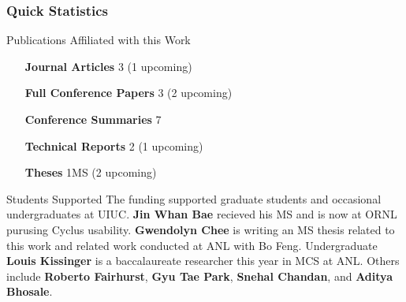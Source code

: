 \begin{frame}
        \frametitle{Quick Statistics}
        \begin{block}{Publications Affiliated with this Work}
                \begin{itemize}
                  \setlength{\itemindent}{3cm}
                        \item[\textbf{Journal Articles}] 3 (1 upcoming)
                        \item[\textbf{Full Conference Papers}] 3 (2 upcoming) 
                        \item[\textbf{Conference Summaries}] 7
                        \item[\textbf{Technical Reports}] 2 (1 upcoming)
                        \item[\textbf{Theses}] 1MS (2 upcoming)
                \end{itemize}
        \end{block}

                \begin{block}{Students Supported}
                        The funding supported graduate students and 
                        occasional undergraduates at UIUC.
                        \textbf{Jin Whan Bae} recieved his MS and is now at 
                        ORNL purusing Cyclus usability.
                        \textbf{Gwendolyn Chee} is writing an MS thesis related 
                        to this work and related work conducted at ANL with Bo Feng.
                        Undergraduate \textbf{Louis Kissinger} is a 
                        baccalaureate researcher this year in MCS at ANL.
                        Others include \textbf{Roberto Fairhurst}, \textbf{Gyu 
                        Tae Park}, \textbf{Snehal Chandan}, and \textbf{Aditya 
                        Bhosale}.
                \end{block}
\end{frame}


